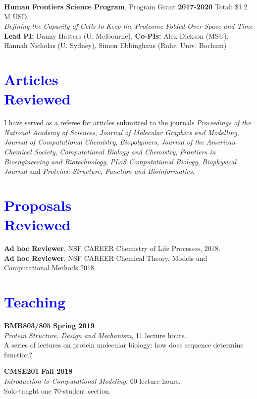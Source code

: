 \documentclass[margin,line]{res}
\begin{document}
\begin{resume}
{\bf Human Frontiers Science Program}, Program Grant \hfill {\bf 2017-2020} Total: \$1.2 M USD \\
 \emph{Defining the Capacity of Cells to Keep the Proteome Folded Over Space and Time}\\
 {\bf Lead PI:} Danny Hatters (U. Melbourne), {\bf Co-PIs:} Alex Dickson (MSU), Hannah Nicholas (U. Sydney), Simon Ebbinghaus (Ruhr. Univ. Bochum) \\

\section{\sc \textcolor{blue}{ Articles \\ Reviewed}}
I have served as a referee for articles submitted to the journals \textit{Proceedings of the National Academy of Sciences}, \textit{Journal of Molecular Graphics and Modelling}, \textit{Journal of Computational Chemistry}, \textit{Biopolymers}, \textit{Journal of the American Chemical Society}, \textit{Computational Biology and Chemistry}, \textit{Frontiers in Bioengineering and Biotechnology}, \textit{PLoS Computational Biology}, \textit{Biophysical Journal} and \textit{Proteins: Structure, Function and Bioinformatics}.

\section{\sc \textcolor{blue}{ Proposals \\ Reviewed}}
        {\bf Ad hoc Reviewer}, NSF CAREER \hfill Chemistry of Life Processes, 2018. \\
        {\bf Ad hoc Reviewer}, NSF CAREER \hfill Chemical Theory, Models and Computational Methods 2018. \\

\section{\sc \textcolor{blue}{ Teaching }}

{\bf BMB803/805} \hfill {\bf Spring 2019} \\
\emph{Protein Structure, Design and Mechanism}, 11 lecture hours.\\
A series of lectures on protein molecular biology: how does sequence determine function?

{\bf CMSE201} \hfill {\bf Fall 2018} \\
\emph{Introduction to Computational Modeling}, 60 lecture hours.\\
Solo-taught one 70-student section.


\end{resume}
\end{document}
